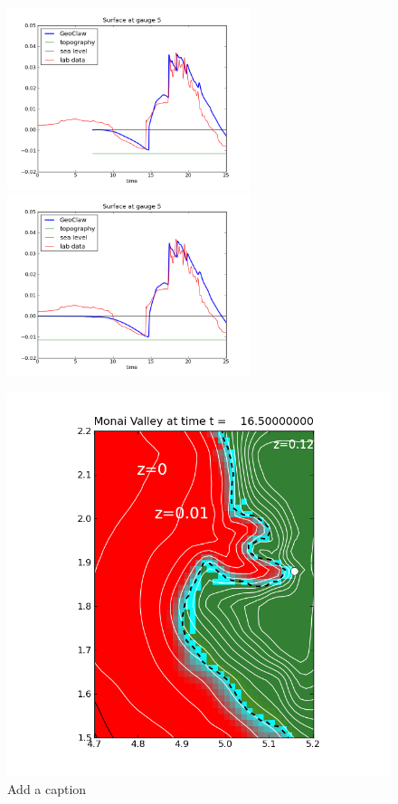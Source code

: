 \begin{figure}[ht]

\hfil\includegraphics[width=2.8in]{bp7/figs423/gauge0005fig300.png}\hfil
\hfil\includegraphics[width=2.8in]{bp7/figs211/gauge0005fig300.png}\hfil

\hfil\includegraphics[width=5.4in]{bp7/figs423/contours.png}\hfil

\caption{\label{fig:bp7gauges}   %
Add a caption
  }
\end{figure}



